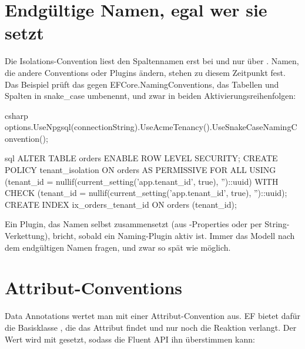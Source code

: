 \section{Endgültige Namen, egal wer sie setzt}

Die Isolations-Convention liest den Spaltennamen erst bei
 und nur über
. Namen, die andere
Conventions oder Plugins ändern, stehen zu diesem Zeitpunkt fest. Das Beispiel prüft das
gegen EFCore.NamingConventions, das Tabellen und Spalten in snake\_case umbenennt, und zwar
in beiden Aktivierungsreihenfolgen:

\begin{sourcecode}[Anwendung]{csharp}
options.UseNpgsql(connectionString).UseAcmeTenancy().UseSnakeCaseNamingConvention();
\end{sourcecode}

\begin{sourcecode}{sql}
ALTER TABLE orders ENABLE ROW LEVEL SECURITY;
CREATE POLICY tenant_isolation ON orders AS PERMISSIVE FOR ALL
    USING (tenant_id = nullif(current_setting('app.tenant_id', true), '')::uuid)
    WITH CHECK (tenant_id = nullif(current_setting('app.tenant_id', true), '')::uuid);
CREATE INDEX ix_orders_tenant_id ON orders (tenant_id);
\end{sourcecode}

\begin{tip}
  Ein Plugin, das Namen selbst zusammensetzt (aus -Properties oder per
  String-Verkettung), bricht, sobald ein Naming-Plugin aktiv ist. Immer das Modell nach dem
  endgültigen Namen fragen, und zwar so spät wie möglich.
\end{tip}

\section{Attribut-Conventions}

Data Annotations wertet man mit einer Attribut-Convention aus. EF bietet dafür die
Basisklasse
,
die das Attribut findet und nur noch die Reaktion verlangt. Der Wert wird mit
 gesetzt, sodass die Fluent API ihn
überstimmen kann:

